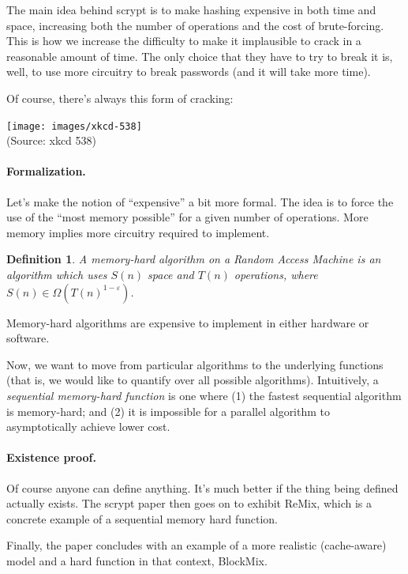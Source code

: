 \documentclass[a4paper]{report}
\begin{document}
The main idea behind scrypt is to make hashing expensive in both time and space,
increasing both the number of operations and the cost of brute-forcing. This is how we increase the difficulty to make it implausible to crack in a reasonable amount of time. The only choice that they have to try to break it is, well, to use more circuitry to break passwords (and it will take more time).

Of course, there's always this form of cracking:
\begin{center}
\texttt{[image: images/xkcd-538]}\\
\hfill (Source: xkcd 538)
\end{center}

\newtheorem{defn}{Definition}

\paragraph{Formalization.} Let's make the notion of ``expensive'' a bit more formal.
The idea is to force the use of the ``most memory possible'' for a given number of
operations. More memory implies more circuitry required to implement.

    \begin{defn}
      A \emph{memory-hard} algorithm on a Random Access Machine is an
      algorithm which uses $S(n)$ space and $T(n)$ operations, where
      $S(n) \in \Omega(T(n)^{1-\varepsilon})$.
    \end{defn}

Memory-hard algorithms are expensive to implement in either hardware or software.

Now, we want to move from particular algorithms to the underlying
functions (that is, we would like to quantify over all possible
algorithms). Intuitively, a \emph{sequential memory-hard function} is
one where (1) the fastest sequential algorithm is memory-hard; and (2)
it is impossible for a parallel algorithm to asymptotically achieve
lower cost.

\paragraph{Existence proof.} Of course anyone can define anything.
It's much better if the thing being defined actually exists. The
scrypt paper then goes on to exhibit ReMix, which is a concrete
example of a sequential memory hard function.

Finally, the paper concludes with an example of a more realistic
(cache-aware) model and a hard function in that context, BlockMix.
\end{document}
